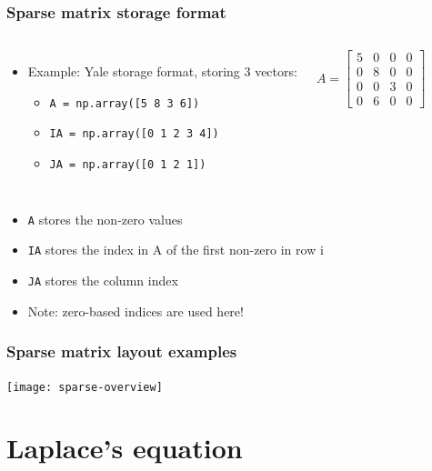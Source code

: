\begin{frame}[fragile]
  \frametitle{Sparse matrix storage format}
  \begin{columns}
  \begin{itemize}
    \item Example: Yale storage format, storing 3 vectors:
    \begin{itemize}
      \item \lstinline$A = np.array([5 8 3 6])$
      \item \lstinline$IA = np.array([0 1 2 3 4])$
      \item \lstinline$JA = np.array([0 1 2 1])$
    \end{itemize}
  \end{itemize}
  \[
   A = 
   \begin{bmatrix}
    5 & 0 & 0 & 0\\
    0 & 8 & 0 & 0\\
    0 & 0 & 3 & 0\\
    0 & 6 & 0 & 0
    \end{bmatrix}
  \]
  \end{columns}
  \begin{itemize}
    \item \lstinline$A$ stores the non-zero values
    \item \lstinline$IA$ stores the index in A of the first non-zero in row i
    \item \lstinline$JA$ stores the column index
    \item Note: zero-based indices are used here!
\end{itemize}
\end{frame}

\begin{frame}[fragile]
  \frametitle{Sparse matrix layout examples}
  \begin{center}
   \texttt{[image: sparse-overview]}
  \end{center}
\end{frame}

\section{Laplace's equation}
